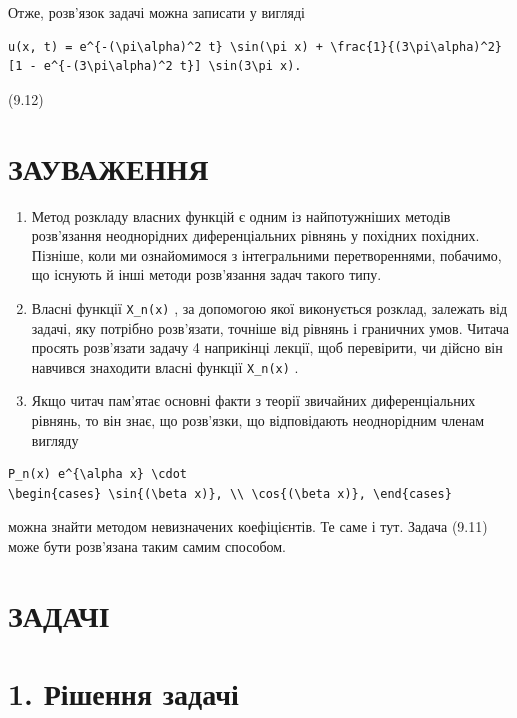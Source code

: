 \documentclass[
  ukrainian,
]{article}
\begin{document}
Отже, розв'язок задачі можна записати у вигляді

\begin{verbatim}
u(x, t) = e^{-(\pi\alpha)^2 t} \sin(\pi x) + \frac{1}{(3\pi\alpha)^2} [1 - e^{-(3\pi\alpha)^2 t}] \sin(3\pi x).
\end{verbatim}

(9.12)

\section{ЗАУВАЖЕННЯ}\label{ux437ux430ux443ux432ux430ux436ux435ux43dux43dux44f-2}

\begin{enumerate}
\def\labelenumi{\arabic{enumi}.}
\item
  Метод розкладу власних функцій є одним із найпотужніших методів
  розв'язання неоднорідних диференціальних рівнянь у похідних похідних.
  Пізніше, коли ми ознайомимося з інтегральними перетвореннями,
  побачимо, що існують й інші методи розв'язання задач такого типу.
\item
  Власні функції \texttt{X\_n(x)} , за допомогою якої виконується
  розклад, залежать від задачі, яку потрібно розв'язати, точніше від
  рівнянь і граничних умов. Читача просять розв'язати задачу 4
  наприкінці лекції, щоб перевірити, чи дійсно він навчився знаходити
  власні функції \texttt{X\_n(x)} .
\item
  Якщо читач пам'ятає основні факти з теорії звичайних диференціальних
  рівнянь, то він знає, що розв'язки, що відповідають неоднорідним
  членам вигляду
\end{enumerate}

\begin{verbatim}
P_n(x) e^{\alpha x} \cdot
\begin{cases} \sin{(\beta x)}, \\ \cos{(\beta x)}, \end{cases}
\end{verbatim}

можна знайти методом невизначених коефіцієнтів. Те саме і тут. Задача
(9.11) може бути розв'язана таким самим способом.

\section{ЗАДАЧІ}\label{ux437ux430ux434ux430ux447ux456}

\section{1. Рішення
задачі}\label{ux440ux456ux448ux435ux43dux43dux44f-ux437ux430ux434ux430ux447ux456}
\end{document}
